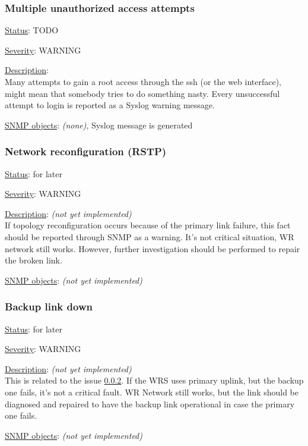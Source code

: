 \subsubsection{\bf Multiple unauthorized access attempts}
		\begin{pck_descr}
			\item [] \underline{Status}: TODO
			\item [] \underline{Severity}: WARNING
			\item [] \underline{Description}:\\
				Many attempts to gain a root access through the ssh (or the web
        interface), might mean that somebody tries to do something nasty. Every
        unsuccessful attempt to login is reported as a Syslog warning message.
			\item [] \underline{SNMP objects}: \emph{(none)}, Syslog message is
        generated
		\end{pck_descr}

\subsubsection{\bf Network reconfiguration (RSTP)}
		\label{fail:other:rstp}
		\begin{pck_descr}
			\item [] \underline{Status}: for later
			\item [] \underline{Severity}: WARNING
			\item [] \underline{Description}: \emph{(not yet implemented)}\\
				If topology reconfiguration occurs because of the primary link failure,
				this fact should be reported through SNMP as a warning. It's not
				critical situation, WR network still works. However, further
				investigation should be performed to repair the broken link.
			\item [] \underline{SNMP objects}: \emph{(not yet implemented)}
		\end{pck_descr}

\subsubsection{\bf Backup link down}
		\begin{pck_descr}
			\item [] \underline{Status}: for later
			\item [] \underline{Severity}: WARNING
			\item [] \underline{Description}: \emph{(not yet implemented)}\\
				This is related to the issue \ref{fail:other:rstp}. If the WRS uses
				primary uplink, but the backup one fails, it's not a critical fault. WR
				Network still works, but the link should be diagnosed and repaired to
				have the backup link operational in case the primary one fails.
			\item [] \underline{SNMP objects}: \emph{(not yet implemented)}
		\end{pck_descr}

